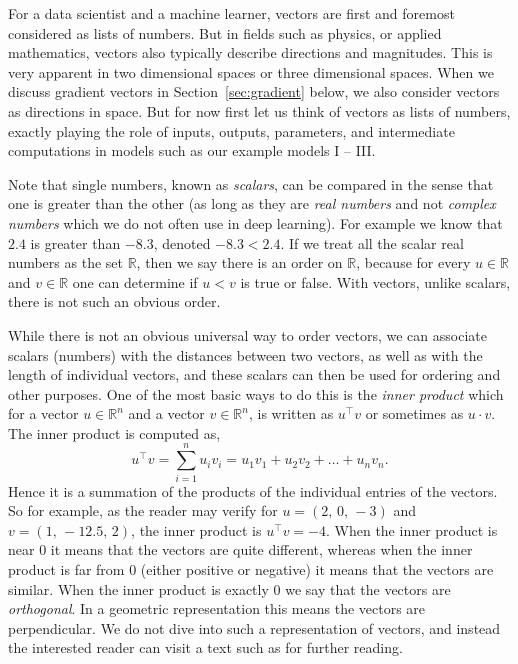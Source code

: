 \documentclass[12pt]{article}
\begin{document}
For a data scientist and a machine learner, vectors are first and foremost considered as lists of numbers. But in fields such as physics, or applied mathematics, vectors also typically describe directions and magnitudes. This is very apparent in two dimensional spaces or three dimensional spaces. When we discuss gradient vectors in Section~\ref{sec:gradient} below, we also consider vectors as directions in space. But for now first let us think of vectors as lists of numbers, exactly playing the role of inputs, outputs, parameters, and intermediate computations in models such as our example models I -- III.

Note that single numbers, known as {\em scalars}, can be compared in the sense that one is greater than the other (as long as they are {\em real numbers} and not {\em complex numbers} which we do not often use in deep learning). For example we know that $2.4$ is greater than $-8.3$, denoted $-8.3 < 2.4$. If we treat all the scalar real numbers as the set ${\mathbb R}$, then we say there is an order on ${\mathbb R}$, because for every $u \in {\mathbb R}$ and $v \in {\mathbb R}$ one can determine if $u < v$ is true or false. With vectors, unlike scalars, there is not such an obvious order. 

While there is not an obvious universal way to order vectors, we can associate scalars (numbers) with the distances between two vectors, as well as with the length of individual vectors, and these scalars can then be used for ordering and other purposes. One of the most basic ways to do this is the {\em inner product} which for a vector $u \in {\mathbb R}^n$ and a vector $v \in {\mathbb R}^n$, is written as $u^\top v$ or sometimes as $u \cdot v$. The inner product is computed as,
%
\begin{equation}
\label{eq:inner product}
u^\top v = \sum_{i=1}^n u_i v_i = u_1 v_1 + u_2 v_2 + \ldots + u_n v_n.
\end{equation}
%
Hence it is a summation of the products of the individual entries of the vectors. So for example, as the reader may verify for $u=(2,\, 0, \, -3)$ and $v=(1,\, -12.5, \, 2)$, the inner product is $u^\top v = -4$. When the inner product is near $0$ it means that the vectors are quite different, whereas when the inner product is far from $0$ (either positive or negative) it means that the vectors are similar. When the inner product is exactly $0$ we say that the vectors are {\em orthogonal}. In a geometric representation this means the vectors are perpendicular. We do not dive into such a representation of vectors, and instead the interested reader can visit a text such as \cite{boyd2018introduction} for further reading.
\end{document}
